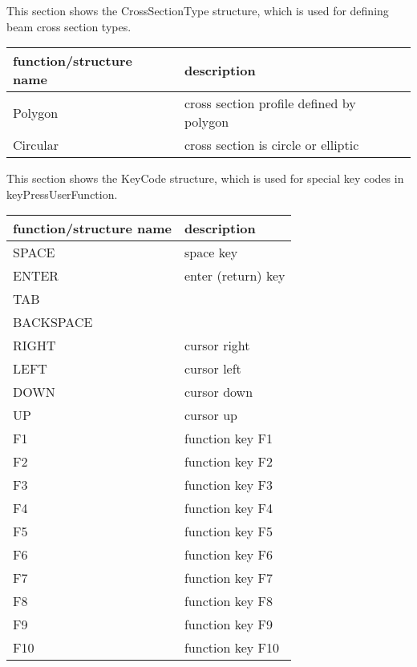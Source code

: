 \label{sec:CrossSectionType}
This section shows the CrossSectionType structure, which is used for defining beam cross section types.



\begin{center}
\footnotesize
\begin{longtable}{| p{8cm} | p{8cm} |} 
\hline
{\bf function/structure name} & {\bf description}\\ \hline
  Polygon & cross section profile defined by polygon\\ \hline  
  Circular & cross section is circle or elliptic\\ \hline  
\end{longtable}
\end{center}

\label{sec:KeyCode}
This section shows the KeyCode structure, which is used for special key codes in keyPressUserFunction.



\begin{center}
\footnotesize
\begin{longtable}{| p{8cm} | p{8cm} |} 
\hline
{\bf function/structure name} & {\bf description}\\ \hline
  SPACE & space key\\ \hline  
  ENTER & enter (return) key\\ \hline  
  TAB & \\ \hline  
  BACKSPACE & \\ \hline  
  RIGHT & cursor right\\ \hline  
  LEFT & cursor left\\ \hline  
  DOWN & cursor down\\ \hline  
  UP & cursor up\\ \hline  
  F1 & function key F1\\ \hline  
  F2 & function key F2\\ \hline  
  F3 & function key F3\\ \hline  
  F4 & function key F4\\ \hline  
  F5 & function key F5\\ \hline  
  F6 & function key F6\\ \hline  
  F7 & function key F7\\ \hline  
  F8 & function key F8\\ \hline  
  F9 & function key F9\\ \hline  
  F10 & function key F10\\ \hline  
\end{longtable}
\end{center}


